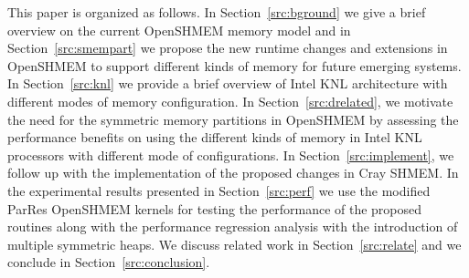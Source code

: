 This paper is organized as follows.
In Section~\ref{src:bground} we give a brief overview on the current
OpenSHMEM memory model and in Section~\ref{src:smempart} we propose the
new runtime changes and extensions in OpenSHMEM to support different kinds
of memory for future emerging systems. In Section~\ref{src:knl} we provide
a brief overview of Intel KNL architecture with different modes of memory
configuration. In Section~\ref{src:drelated}, we motivate the need for
the symmetric memory partitions in OpenSHMEM by assessing the performance
benefits on using the different kinds of memory in Intel KNL processors
with different mode of configurations. In Section~\ref{src:implement}, we
follow up with the implementation of the proposed changes in Cray SHMEM.
In the experimental results presented in Section~\ref{src:perf} we use
the modified ParRes OpenSHMEM kernels for testing the performance of the
proposed routines along with the performance regression analysis with the
introduction of multiple symmetric heaps. We discuss related work
in Section~\ref{src:relate} and we conclude in Section~\ref{src:conclusion}.